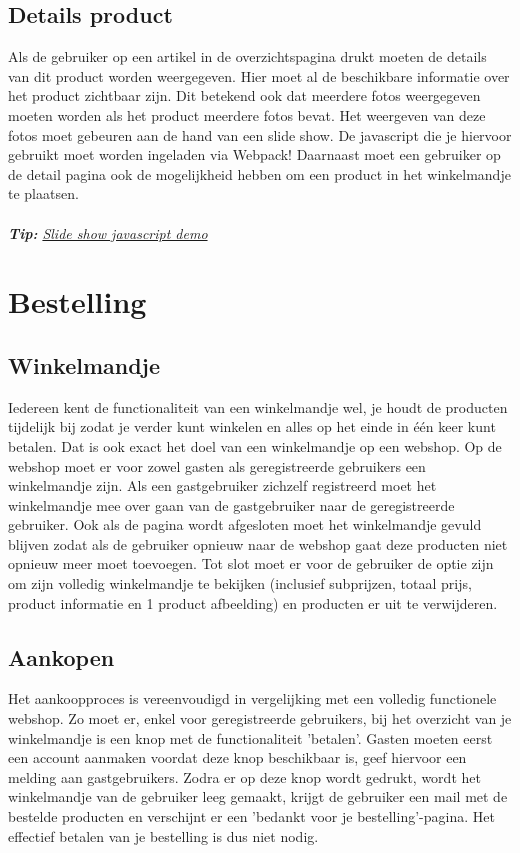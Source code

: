 \documentclass{article}
\begin{document}
\subsection{Details product}
Als de gebruiker op een artikel in de overzichtspagina drukt moeten de details van dit product worden weergegeven. Hier moet al de beschikbare informatie over het product zichtbaar zijn. Dit betekend ook dat meerdere fotos weergegeven moeten worden als het product meerdere fotos bevat. Het weergeven van deze fotos moet gebeuren aan de hand van een slide show. De javascript die je hiervoor gebruikt moet worden ingeladen via Webpack! Daarnaast moet een gebruiker op de detail pagina ook de mogelijkheid hebben om een product in het winkelmandje te plaatsen. 
\\
\\
\textit{\textbf{Tip:} \href{https://www.w3schools.com/howto/howto_js_slideshow.asp}{Slide show javascript demo}}

\section{Bestelling}
\subsection{Winkelmandje}
Iedereen kent de functionaliteit van een winkelmandje wel, je houdt de producten tijdelijk bij zodat je verder kunt winkelen en alles op het einde in één keer kunt betalen. Dat is ook exact het doel van een winkelmandje op een webshop. Op de webshop moet er voor zowel gasten als geregistreerde gebruikers een winkelmandje zijn. Als een gastgebruiker zichzelf registreerd moet het winkelmandje mee over gaan van de gastgebruiker naar de geregistreerde gebruiker. Ook als de pagina wordt afgesloten moet het winkelmandje gevuld blijven zodat als de gebruiker opnieuw naar de webshop gaat deze producten niet opnieuw meer moet toevoegen. Tot slot moet er voor de gebruiker de optie zijn om zijn volledig winkelmandje te bekijken (inclusief subprijzen, totaal prijs, product informatie en 1 product afbeelding) en producten er uit te verwijderen. 

\subsection{Aankopen}
Het aankoopproces is vereenvoudigd in vergelijking met een volledig functionele webshop. Zo moet er, enkel voor geregistreerde gebruikers, bij het overzicht van je winkelmandje is een knop met de functionaliteit 'betalen'. Gasten moeten eerst een account aanmaken voordat deze knop beschikbaar is, geef hiervoor een melding aan gastgebruikers. Zodra er op deze knop wordt gedrukt, wordt het winkelmandje van de gebruiker leeg gemaakt, krijgt de gebruiker een mail met de bestelde producten en verschijnt er een 'bedankt voor je bestelling'-pagina. Het effectief betalen van je bestelling is dus niet nodig.
\end{document}
